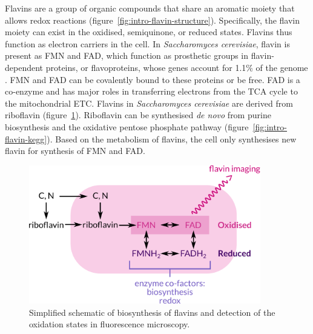 Flavins are a group of organic compounds that share an aromatic moiety that allows redox reactions (figure~\ref{fig:intro-flavin-structure}).
Specifically, the flavin moiety can exist in the oxidised, semiquinone, or reduced states.
Flavins thus function as electron carriers in the cell.
In \emph{Saccharomyces cerevisiae}, flavin is present as FMN and FAD, which function as prosthetic groups in flavin-dependent proteins, or flavoproteins, whose genes account for 1.1\% of the genome \parencite{gudipatiFlavoproteomeYeastSaccharomyces2014}.
FMN and FAD can be covalently bound to these proteins or be free.
FAD is a co-enzyme and has major roles in transferring electrons from the TCA cycle to the mitochondrial ETC.
Flavins in \emph{Saccharomyces cerevisiae} are derived from riboflavin (figure~\ref{fig:intro-flavin-schematic}).
Riboflavin can be synthesised \emph{de novo} from purine biosynthesis and the oxidative pentose phosphate pathway (figure~\ref{fig:intro-flavin-kegg}).
Based on the metabolism of flavins, the cell only synthesises new flavin for synthesis of FMN and FAD.


\begin{figure}
  \centering
  \includegraphics[width=0.9\textwidth]{flavin-cell-schematic}
  \caption{
    Simplified schematic of biosynthesis of flavins and detection of the oxidation states in fluorescence microscopy.
    }
  \label{fig:intro-flavin-schematic}
\end{figure}

